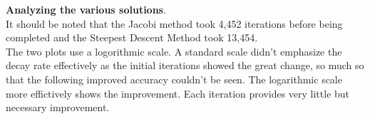 \documentclass[12pt,a4paper]{report}
\begin{document}
\noindent\textbf{Analyzing the various solutions}.\\

It should be noted that the Jacobi method took 4,452 iterations before being completed and the Steepest Descent Method took 13,454.\\  

The two plots use a logorithmic scale.  A standard scale didn't emphasize the decay rate effectively as the initial iterations showed the great change, so much so that the following improved accuracy couldn't be seen.  The logarithmic scale more effictively shows the improvement.  Each iteration provides very little but necessary improvement.
\end{document}
